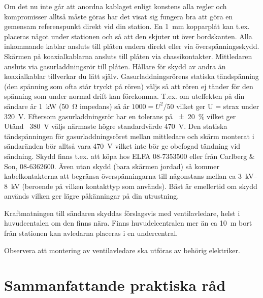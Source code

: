 Om det nu inte går att anordna kablaget enligt konstens alla regler och
kompromisser alltså måste göras har det visat sig fungera bra att göra en
gemensam referenspunkt direkt vid din station.
En \qty{1}{\milli\metre} kopparplåt kan t.ex. placeras något under stationen och
så att den skjuter ut över bordskanten.
Alla inkommande kablar ansluts till plåten endera direkt eller via
överspänningsskydd.
Skärmen på koaxialkablarna ansluts till plåten via chassikontakter.
Mittledaren ansluts via gasurladdningsrör till plåten.
Hållare för skydd av andra än koaxialkablar tillverkar du lätt själv.
Gasurladdningsrörens statiska tändspänning (den spänning som ofta står tryckt på
rören) väljs så att rören ej tänder för den spänning som under normal drift kan
förekomma.
T.ex. om uteffekten på din sändare är \qty{1}{\kilo\watt} (\qty{50}{\ohm}
impedans) så är \(1000 = U^{2}/50\) vilket ger U = strax under \qty{320}{\volt}.
Eftersom gasurladdningsrör har en tolerans på \qty{+-20}{\percent} vilket ger
Utänd~ \qty{380}{\volt} väljs närmaste högre standardvärde \qty{470}{\volt}.
Den statiska tändspänningen för gasurladdningsröret mellan mittledare och skärm
monterat i sändaränden bör alltså vara \qty{470}{\volt} vilket inte bör ge
obefogad tändning vid sändning.
Skydd finns t.ex. att köpa hos ELFA 08-7353500 eller från Carlberg \& Son, 08-6362600.
Även utan skydd (bara skärmen jordad) så kommer kabelkontakterna att begränsa
överspänningarna till någonstans mellan ca \qtyrange{3}{8}{\kilo\volt} (beroende
på vilken kontakttyp som används).
Bäst är emellertid om skydd används vilken ger lägre påkänningar på din utrustning.

Kraftmatningen till sändaren skyddas förslagsvis med ventilavledare, helst i
huvudcentalen om den finns nära.
Finns huvudelcentralen mer än ca \qty{10}{\metre} bort från stationen kan
avledarna placeras i en undercentral.


Observera att montering av ventilavledare ska utföras av behörig elektriker.

\section{Sammanfattande praktiska råd}

